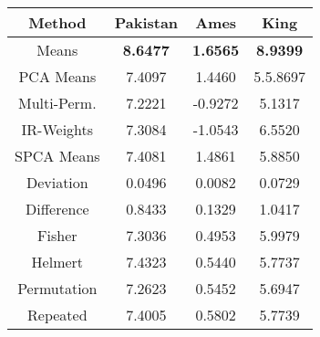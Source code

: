 \begin{tabular}{ |c|c|c|c| } 
\hline
Method & Pakistan& Ames& King \\
\hline
Means&	\textbf{8.6477}&		\textbf{1.6565}&		\textbf{8.9399}\\
PCA Means&	7.4097&	 1.4460 &		5.5.8697\\
Multi-Perm.&	7.2221&		-0.9272&		5.1317\\
IR-Weights&	7.3084&		-1.0543&		6.5520\\
SPCA Means&	7.4081&		1.4861&		5.8850\\
Deviation&	0.0496&		0.0082&		0.0729\\
Difference&0.8433&		0.1329&		1.0417\\
Fisher&	7.3036&	0.4953&		5.9979\\
Helmert&	7.4323&		0.5440&		5.7737\\
Permutation&	7.2623&		0.5452&	5.6947\\
Repeated&	7.4005&		0.5802&		5.7739\\



\hline
\end{tabular}